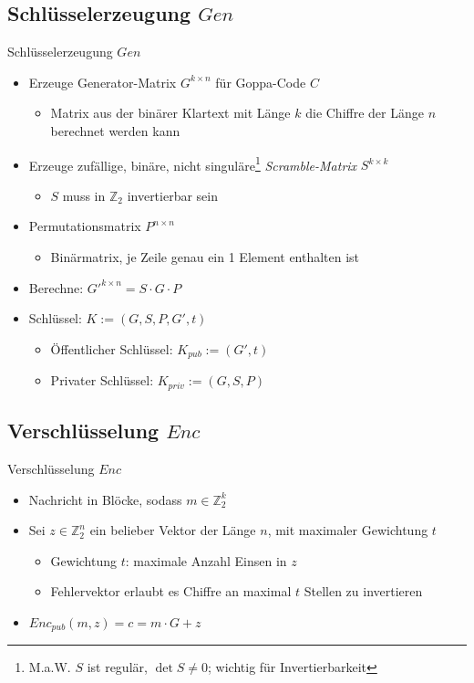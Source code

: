 \documentclass[11pt%
,aspectratio=169%
]{beamer}
\begin{document}
\subsection{Schlüsselerzeugung $Gen$}
\begin{frame}{Schlüsselerzeugung $Gen$}
\begin{itemize}
    \item Erzeuge Generator-Matrix $G^{k \times n}$  für Goppa-Code $C$
    \begin{itemize}
        \item Matrix aus der binärer Klartext mit Länge $k$ die Chiffre der Länge $n$ berechnet werden kann
    \end{itemize}
    \item Erzeuge zufällige, binäre, nicht singuläre\footnote{M.a.W. $S$ ist regulär, $\det S \neq 0$; wichtig für Invertierbarkeit} \emph{Scramble-Matrix} $S^{k \times k}$
    \begin{itemize}
        \item $S$ muss in $\mathbb{Z}_2$ invertierbar sein
    \end{itemize}
    \item Permutationsmatrix $P^{n \times n}$
    \begin{itemize}
        \item Binärmatrix, je Zeile genau ein 1 Element enthalten ist
    \end{itemize}
    \item Berechne: $G'^{k \times n} = S \cdot G \cdot P$
    \item Schlüssel: $K := (G,S,P,G',t)$
    \begin{itemize}
        \item Öffentlicher Schlüssel: $K_{pub}:= (G', t)$
        \item Privater Schlüssel: $K_{priv} := (G,S,P)$
    \end{itemize}
\end{itemize}
\end{frame}

\subsection{Verschlüsselung $Enc$}
\begin{frame}{Verschlüsselung $Enc$}
    \begin{itemize}
        \item Nachricht in Blöcke, sodass $m \in \mathbb{Z}_2^k$
        \item Sei $z \in \mathbb{Z}_2^n$ ein belieber Vektor der Länge $n$, mit maximaler Gewichtung $t$
        \begin{itemize}
            \item Gewichtung $t$: maximale Anzahl Einsen in $z$
            \item Fehlervektor erlaubt es Chiffre an maximal $t$ Stellen zu invertieren
        \end{itemize}   
        \item $Enc_{pub}(m,z) = c = m \cdot G + z$
    \end{itemize}
\end{frame}
    
\end{document}
